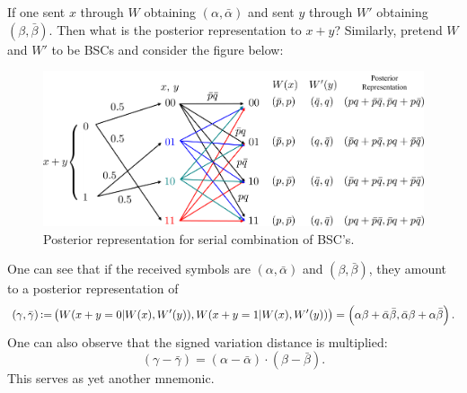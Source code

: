 If one sent $x$ through $W$ obtaining $(\alpha,\bar{\alpha})$ and sent $y$ through $W'$ obtaining $(\beta,\bar{\beta})$. Then what is the posterior representation to $x+y$? Similarly, pretend $W$ and $W'$ to be BSCs and consider the figure below:
\begin{figure}[H]
    \centering
    \includegraphics[width=0.9\linewidth]{figures/w5_post_serial.png}
    \caption{Posterior representation for serial combination of BSC's.}
\end{figure}
One can see that if the received symbols are $(\alpha,\bar{\alpha})$ and $(\beta,\bar{\beta})$, they amount to a posterior representation of
\begin{equation}
    (\gamma,\bar{\gamma}) \operatorname{\vcentcolon=} \left(W(x+y=0\vert W(x),W'(y)), W(x+y=1\vert W(x),W'(y))\right) = \left(\alpha\beta + \bar{\alpha}\bar{\beta},\bar{\alpha}\beta + \alpha\bar{\beta}\right).
\end{equation}
One can also observe that the signed variation distance is multiplied:
\begin{equation}
    (\gamma-\bar{\gamma}) = (\alpha-\bar{\alpha}) \cdot (\beta-\bar{\beta}).
\end{equation}
This serves as yet another mnemonic.

